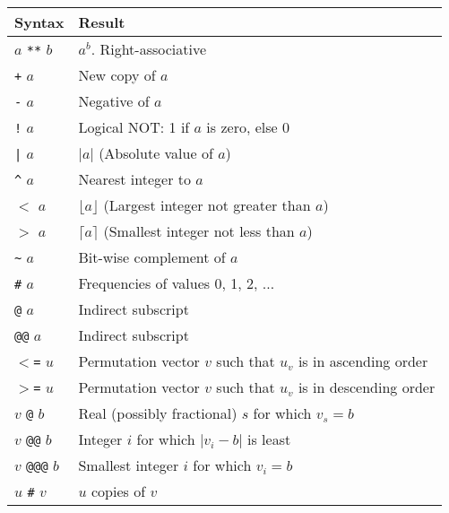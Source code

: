 \begin{tabular}{|l|l|}
    \hline 
      \textbf{Syntax} & 
      \textbf{Result}
    \\
    \hline 
    \hline 
        $a$
        \texttt{**}
        $b$
       & 
      $a^b$. Right-associative
    \\
    \hline
        \texttt{+}
        $a$
       & 
      New copy of 
      $a$
    \\
        \texttt{-}
        $a$
       & 
      Negative of 
      $a$
    \\
        \texttt{!}
        $a$
       & 
      Logical NOT: 1 if 
      $a$ is zero, else 0
    \\
        \texttt{|}
        $a$
       & 
      $|a|$ (Absolute value of $a$)
    \\
        \texttt{\^}
        $a$
       & 
      Nearest integer to $a$
    \\
        \texttt{$<$}
        $a$
       & 
      $\lfloor a \rfloor$ (Largest integer not greater than $a$)
    \\
        \texttt{$>$}
        $a$
       & 
      $\lceil a \rceil$ (Smallest integer not less than $a$)
    \\
        \verb!~!
        $a$
       & 
      Bit-wise complement of 
      $a$
    \\
        \texttt{\#}
        $a$
       & 
      Frequencies of values 0, 1, 2, $\ldots$
    \\
        \texttt{@}
        $a$
       & 
      Indirect subscript
    \\
        \texttt{@@}
        $a$
       & 
      Indirect subscript
    \\
        \texttt{$<$=}
        $u$
       & 
      Permutation vector $v$ such that $u_v$ is in ascending order
    \\
        \texttt{$>$=}
        $u$
       & 
      Permutation vector $v$ such that $u_v$ is in descending order
    \\
    \hline
        $v$
        \texttt{@}
        $b$
       & 
      Real (possibly fractional) $s$ for which $v_s=b$
    \\
        $v$ \texttt{@@} $b$
       & 
      Integer $i$ for which $|v_i-b|$ is least
    \\
        $v$
        \texttt{@@@}
        $b$
       & 
      Smallest integer $i$ for which $v_i=b$
    \\
    \hline
        $u$
        \texttt{\#}
        $v$
       & 
      $u$ copies of 
      $v$

\end{tabular}
